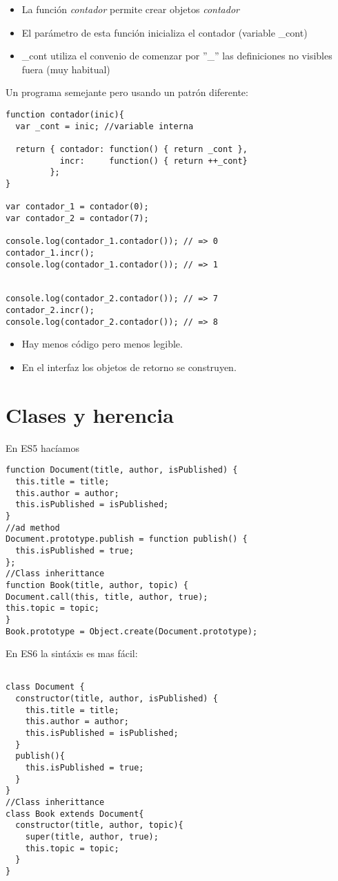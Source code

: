 \documentclass[4paper]{article}
\begin{document}
\begin{itemize}
\item La función \emph{contador} permite crear objetos \emph{contador}
\item El parámetro de esta función inicializa el contador (variable \_cont)
\item \_cont utiliza el convenio de comenzar por ''\_'' las definiciones no visibles fuera (muy habitual)
\end{itemize}
Un programa semejante pero usando un patrón diferente:
\begin{lstlisting}
function contador(inic){
  var _cont = inic; //variable interna

  return { contador: function() { return _cont },
           incr:     function() { return ++_cont}
         };
}

var contador_1 = contador(0);
var contador_2 = contador(7);

console.log(contador_1.contador()); // => 0
contador_1.incr();
console.log(contador_1.contador()); // => 1


console.log(contador_2.contador()); // => 7
contador_2.incr();
console.log(contador_2.contador()); // => 8
\end{lstlisting}
\begin{itemize}
\item Hay menos código pero menos legible.
\item En el interfaz los objetos de retorno se construyen.
\end{itemize}
\newpage

\section{Clases y herencia}
En ES5 hacíamos
\begin{lstlisting}
function Document(title, author, isPublished) {
  this.title = title;
  this.author = author;
  this.isPublished = isPublished;
}
//ad method
Document.prototype.publish = function publish() {
  this.isPublished = true;
};
//Class inherittance
function Book(title, author, topic) {
Document.call(this, title, author, true);
this.topic = topic;
}
Book.prototype = Object.create(Document.prototype);
\end{lstlisting}
En ES6 la sintáxis es mas fácil:
\begin{lstlisting}

class Document {
  constructor(title, author, isPublished) {
    this.title = title;
    this.author = author;
    this.isPublished = isPublished;
  }
  publish(){
    this.isPublished = true;
  }
}
//Class inherittance
class Book extends Document{
  constructor(title, author, topic){
    super(title, author, true);
    this.topic = topic;
  }
}
\end{lstlisting}
\end{document}
